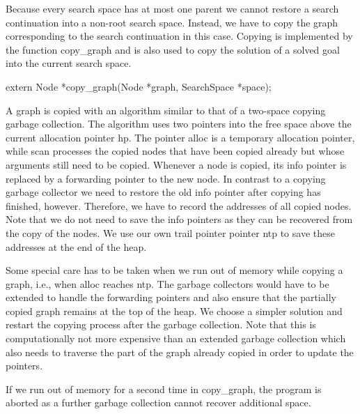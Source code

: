\nwendcode{}\nwdocspar
Because every search space has at most one parent we cannot restore a
search continuation into a non-root search space. Instead, we have to
copy the graph corresponding to the search continuation in this
case. Copying is implemented by the function {\Tt{}copy{\_}graph\nwendquote} and is
also used to copy the solution of a solved goal into the current
search space.

\nwenddocs{}\plusendmoddef\nwstartdeflinemarkup{}\nwenddeflinemarkup
extern Node *copy_graph(Node *graph, SearchSpace *space);

\nwendcode{}\nwdocspar
A graph is copied with an algorithm similar to that of a two-space
copying garbage collection. The algorithm uses two pointers into the
free space above the current allocation pointer {\Tt{}hp\nwendquote}. The pointer
{\Tt{}alloc\nwendquote} is a temporary allocation pointer, while {\Tt{}scan\nwendquote} processes
the copied nodes that have been copied already but whose arguments
still need to be copied. Whenever a node is copied, its info pointer
is replaced by a forwarding pointer to the new node. In contrast to a
copying garbage collector we need to restore the old info pointer
after copying has finished, however. Therefore, we have to record the
addresses of all copied nodes. Note that we do not need to save the
info pointers as they can be recovered from the copy of the nodes. We
use our own trail pointer pointer {\Tt{}ntp\nwendquote} to save these addresses at
the end of the heap.

Some special care has to be taken when we run out of memory while
copying a graph, i.e., when {\Tt{}alloc\nwendquote} reaches {\Tt{}ntp\nwendquote}. The garbage
collectors would have to be extended to handle the forwarding pointers
and also ensure that the partially copied graph remains at the top of
the heap. We choose a simpler solution and restart the copying process
after the garbage collection. Note that this is computationally not
more expensive than an extended garbage collection which also needs to
traverse the part of the graph already copied in order to update the
pointers.

If we run out of memory for a second time in {\Tt{}copy{\_}graph\nwendquote}, the
program is aborted as a further garbage collection cannot recover
additional space.

